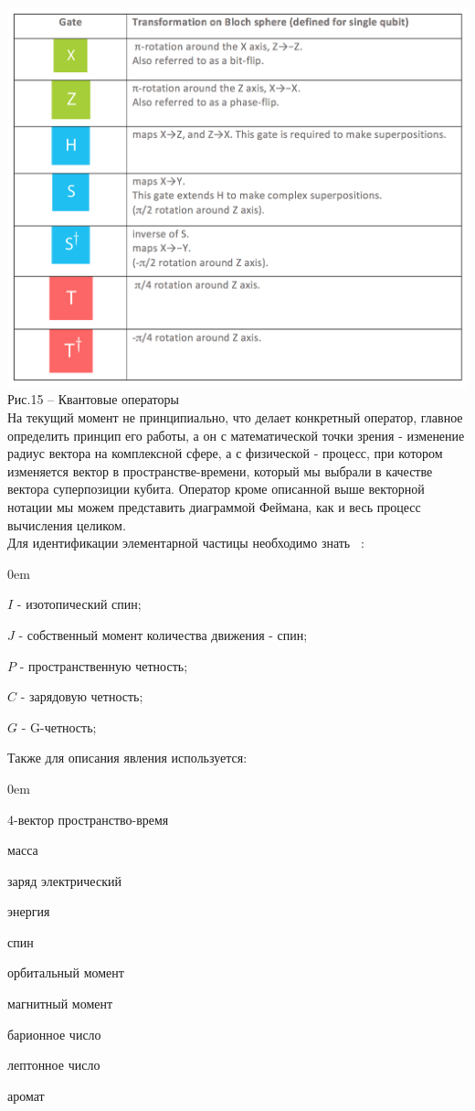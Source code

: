 \documentclass[11pt]{report}
\begin{document}
\includegraphics[scale=0.2]{operators} \\
Рис.15 -- Квантовые операторы \\

На текущий момент не принципиально, что делает конкретный оператор, главное определить принцип его работы, а он с математической точки зрения - изменение радиус вектора на комплексной сфере, а с физической - процесс, при котором изменяется вектор в пространстве-времени, который мы выбрали в качестве вектора суперпозиции кубита. Оператор кроме описанной выше векторной нотации мы можем представить диаграммой Феймана, как и весь процесс вычисления целиком. \\

Для идентификации элементарной частицы необходимо знать ~\cite{saricheva}:
\begin{description}
\addtolength{\itemindent}{0.80cm}
\itemsep0em 
\item[] $I $ - изотопический спин;
\item[] $J $ - собственный момент количества движения - спин;
\item[] $P $ - пространственную четность;
\item[] $C $  - зарядовую четность;
\item[] $G $ - G-четность;
\end{description} 

Также для описания явления используется:
\begin{description}
\addtolength{\itemindent}{0.80cm}
\itemsep0em 
\item[R] 4-вектор  пространство-время
\item[M] масса
\item[Q] заряд электрический
\item[E] энергия
\item[J] спин
\item[S] орбитальный момент
\item[$\mu$] магнитный момент
\item[B] барионное число
\item[L] лептонное число
\item[C] аромат
\end{description}
\end{document}
